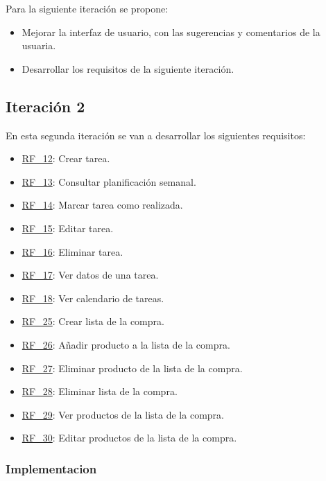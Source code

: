 Para la siguiente iteración se propone:

\begin{itemize}
    \item Mejorar la interfaz de usuario, con las sugerencias y comentarios de la usuaria.
    \item Desarrollar los requisitos de la siguiente iteración.
\end{itemize}

\newpage

\subsection{Iteración 2}

En esta segunda iteración se van a desarrollar los siguientes requisitos:

\begin{itemize}
    \item {\hyperref[req:RF12]{RF\_12}}: Crear tarea.
    \item {\hyperref[req:RF13]{RF\_13}}: Consultar planificación semanal.
    \item {\hyperref[req:RF14]{RF\_14}}: Marcar tarea como realizada.
    \item {\hyperref[req:RF15]{RF\_15}}: Editar tarea.
    \item {\hyperref[req:RF16]{RF\_16}}: Eliminar tarea.
    \item {\hyperref[req:RF17]{RF\_17}}: Ver datos de una tarea.
    \item {\hyperref[req:RF18]{RF\_18}}: Ver calendario de tareas.
    \item {\hyperref[req:RF25]{RF\_25}}: Crear lista de la compra.
    \item {\hyperref[req:RF26]{RF\_26}}: Añadir producto a la lista de la compra.
    \item {\hyperref[req:RF27]{RF\_27}}: Eliminar producto de la lista de la compra.
    \item {\hyperref[req:RF28]{RF\_28}}: Eliminar lista de la compra.
    \item {\hyperref[req:RF29]{RF\_29}}: Ver productos de la lista de la compra.
    \item {\hyperref[req:RF30]{RF\_30}}: Editar productos de la lista de la compra.
\end{itemize}


\subsubsection{Implementacion}

